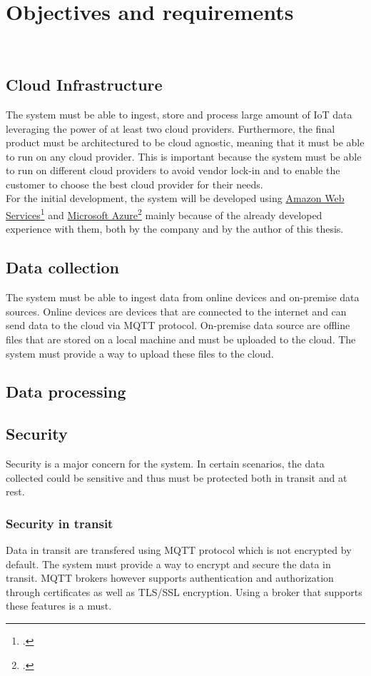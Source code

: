 \chapter{Objectives and requirements}
\label{cap:requirements}
\\

\section{Cloud Infrastructure}
The system must be able to ingest, store and process large amount of IoT data leveraging the power of at least two cloud providers. Furthermore, the final product must be architectured to be cloud agnostic, meaning that it must be able to run on any cloud provider. This is important because the system must be able to run on different cloud providers to avoid vendor lock-in and to enable the customer to choose the best cloud provider for their needs.\\
For the initial development, the system will be developed using \href{https://aws.amazon.com/it/}{Amazon Web Services}\footcite{site:aws} and \href{https://azure.microsoft.com/it-it/}{Microsoft Azure}\footcite{site:azure} mainly because of the already developed
experience with them, both by the company and by the author of this thesis.

\section{Data collection}
The system must be able to ingest data from online devices and on-premise data sources. 
Online devices are devices that are connected to the internet and can send data to the cloud via MQTT protocol.
On-premise data source are offline files that are stored on a local machine and must be uploaded to the cloud. The system must provide a way to upload these files to the cloud.
\section{Data processing}

\section{Security}
Security is a major concern for the system. In certain scenarios, the data collected could be sensitive and thus must be protected both in transit and at rest.
    \subsection{Security in transit}
    Data in transit are transfered using MQTT protocol which is not encrypted by default. The system must provide a way to encrypt and secure the data in transit. MQTT brokers however supports authentication and authorization through certificates as well as TLS/SSL encryption. Using a broker that supports these features is a must.
    
